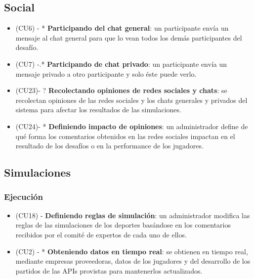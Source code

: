 \subsection{Social}
\begin{itemize}
\item (CU6) - * \textbf{Participando del chat general}: un participante envía un mensaje al chat general para que lo vean todos los demás participantes del desafío.
\item (CU7) -.* \textbf{Participando de chat privado}: un participante envía un mensaje privado a otro participante y solo éste puede verlo.
\item (CU23)- ? \textbf{Recolectando opiniones de redes sociales y chats}: se recolectan opiniones de las redes sociales y los chats generales y privados del sistema para afectar los resultados de las simulaciones.
\item (CU24)- * \textbf{Definiendo impacto de opiniones}: un administrador define de qué forma los comentarios obtenidos en las redes sociales impactan en el resultado de los desafíos o en la performance de los jugadores.
\end{itemize}

\subsection{Simulaciones}
\subsubsection{Ejecución}
\begin{itemize}
\item (CU18) - \textbf{Definiendo reglas de simulación}: un administrador modifica las reglas de las simulaciones de los deportes basándose en los comentarios recibidos por el comité de expertos de cada uno de ellos.
\item (CU2) - * \textbf{Obteniendo datos en tiempo real}: se obtienen en tiempo real, mediante empresas proveedoras, datos de los jugadores y del desarrollo de los partidos de las APIs provistas para mantenerlos actualizados. 
\end{itemize}


